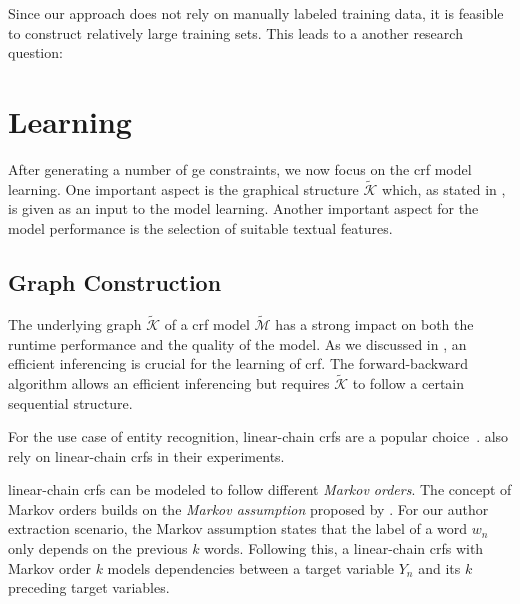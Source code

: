\bigskip

Since our approach does not rely on manually labeled training data, it is feasible to construct relatively large training sets.
This leads to a another research question:
\newcommand\researchquestionsix{}
\researchquestionsix%




\section{Learning }\label{sec:ae-learning-crfs}

After generating a number of \gls{ge} constraints, we now focus on the \gls{crf} model learning.
One important aspect is the graphical structure $\mathcal{\tilde{K}}$ which, as stated in , is given as an input to the model learning.
Another important aspect for the model performance is the selection of suitable textual features.

\subsection{Graph Construction}\label{subsec:ae-graph-construction}

The underlying graph $\mathcal{\tilde{K}}$ of a \gls{crf} model $\mathcal{\tilde{M}}$ has a strong impact on both the runtime performance and the quality of the model.
As we discussed in , an efficient inferencing is crucial for the learning of \gls{crf}.
The \gls{forward-backward algorithm} allows an efficient inferencing but requires $\mathcal{\tilde{K}}$ to follow a certain sequential structure.

For the use case of entity recognition, \glspl{linear-chain crf} are a popular choice~\citep[e.g.][]{peng2004accurate,mann2008generalized,ling2012fine,groza2012reference,ohta2014empirical}.
\citet{lu2013web} also rely on \glspl{linear-chain crf} in their experiments.

\Glspl{linear-chain crf} can be modeled to follow different \textit{Markov orders}.
The concept of Markov orders builds on the \textit{Markov assumption} proposed by \citet{markov1957theory}.
For our author extraction scenario, the Markov assumption states that the label of a word $w_n$ only depends on the previous $k$ words.
Following this, a \glspl{linear-chain crf} with Markov order $k$ models dependencies between a \gls{target variable} $Y_n$ and its $k$ preceding \glspl{target variable}.

